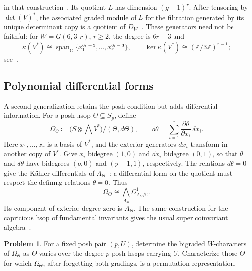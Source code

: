 \documentclass[11pt]{amsart}
\newcommand{\defeq}{\coloneqq}
\theoremstyle{definition}
\newtheorem{problem}[theorem]{Problem}
\newcommand{\C}{\mathbb C}\newcommand{\Q}{\mathbb Q}
\newcommand{\Z}{\mathbb Z}\newcommand{\N}{\mathbb Z_{\ge0}}
\begin{document}
\begin{itemize}
in that construction~\cite[Theorem~1.2 and Section~3R]{GriffethDiagonal}.
Its quotient $L$ has dimension $(g+1)^r$. After tensoring by
$\det(V)^*$, the associated graded module of $L$ for the filtration
generated by its unique determinant copy is a quotient of
$D_W$~\cite[Lemma~3.1]{GriffethDiagonal}.
These generators need not be faithful: for $W=G(6,3,r)$, $r\geq2$,
the degree is $6r-3$ and
\[
 \kappa(V^*)\cong\operatorname{span}_{\C}\{x_1^{6r-3},\ldots,x_r^{6r-3}\},
 \qquad \ker\kappa(V^*)\cong(\Z/3\Z)^{r-1};
\]
see~\cite[Section~8]{EquivariantParameters}.
\end{itemize}

\subsection{Polynomial differential forms}

A second generalization retains the posh condition but adds differential
information. For a posh hsop $\Theta\subseteq S_p$, define
\[
 \Omega_\Theta\defeq
 \bigl(S\otimes\textstyle\bigwedge V^*\bigr)/(\Theta,d\Theta),
 \qquad
 d\theta=\sum_{i=1}^r
       \frac{\partial\theta}{\partial x_i}\,dx_i.
\]
Here $x_1,\ldots,x_r$ is a basis of $V^*$, and the exterior generators
$dx_i$ transform in another copy of $V^*$.
Give $x_i$ bidegree $(1,0)$ and $dx_i$ bidegree $(0,1)$, so that $\theta$ and $d\theta$ have bidegrees $(p,0)$ and
$(p-1,1)$, respectively. 
The relations $d\theta=0$ give the K\"ahler differentials of
$A_\Theta$~\cite[Tag~00RU]{Stacks}: a differential form on the quotient
must respect the defining relations $\theta=0$. Thus
\[
 \Omega_\Theta\cong
 \textstyle\bigwedge_{A_\Theta}\Omega^1_{A_\Theta/\C}.
\]
Its component of exterior degree zero is $A_\Theta$. The same construction for the capricious hsop of
fundamental invariants gives the usual super coinvariant
algebra~\cite[Section~5]{SwansonWallachForms}.

\begin{problem}\label{prob:differential-parking}
For a fixed posh pair $(p,U)$, determine the bigraded $W$-characters
of $\Omega_\Theta$ as $\Theta$ varies over the degree-$p$ posh hsops
carrying $U$. Characterize those $\Theta$ for which $\Omega_\Theta$,
after forgetting both gradings, is a permutation representation.
\end{problem}
\end{document}
